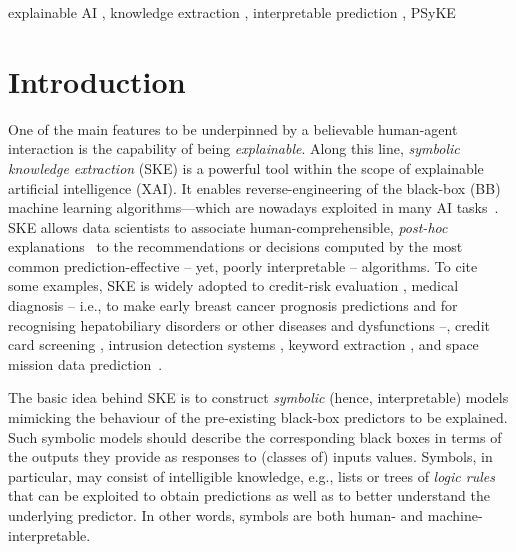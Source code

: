 \documentclass[
]{ceurart}
\begin{document}
\begin{keywords}
	explainable AI 
	\sep
  	knowledge extraction 
	\sep
	interpretable prediction 
	\sep
  	PSyKE
\end{keywords}

\maketitle

\section{Introduction}

One of the main features to be underpinned by a believable human-agent interaction is the capability of being \emph{explainable}. 
%
Along this line, \emph{symbolic knowledge extraction} (SKE) is a powerful tool within the scope of explainable artificial intelligence (XAI).
%
It enables reverse-engineering of the black-box (BB) machine learning algorithms---which are nowadays exploited in many AI tasks~\cite{rocha2012far}.
%
SKE allows data scientists to associate human-comprehensible, \emph{post-hoc} explanations~\cite{KENNY2021103459} to the recommendations or decisions computed by the most common prediction-effective -- yet, poorly interpretable -- algorithms.
%
To cite some examples, SKE is widely adopted to credit-risk evaluation \cite{baesens2003using,baesens2001building,steiner2006using}, medical diagnosis -- i.e., to make early breast cancer prognosis predictions \cite{franco2007early} and for recognising hepatobiliary disorders \cite{hayashi2000comparison} or other diseases and dysfunctions \cite{bologna1997three} --, credit card screening \cite{setiono2011rule}, intrusion detection systems \cite{hofmann2003rule}, keyword extraction \cite{azcarraga2012keyword}, and space mission data prediction~\cite{sabbatini22LPFSKE}.

The basic idea behind SKE is to construct \emph{symbolic} (hence, interpretable) models mimicking the behaviour of the pre-existing black-box predictors to be explained.
%
Such symbolic models should describe the corresponding black boxes in terms of the outputs they provide as responses to (classes of) inputs values.
%
Symbols, in particular, may consist of intelligible knowledge, e.g., lists or trees of \emph{logic rules} that can be exploited to obtain predictions as well as to better understand the underlying predictor.
%
In other words, symbols are both human- and machine-interpretable.
\end{document}

